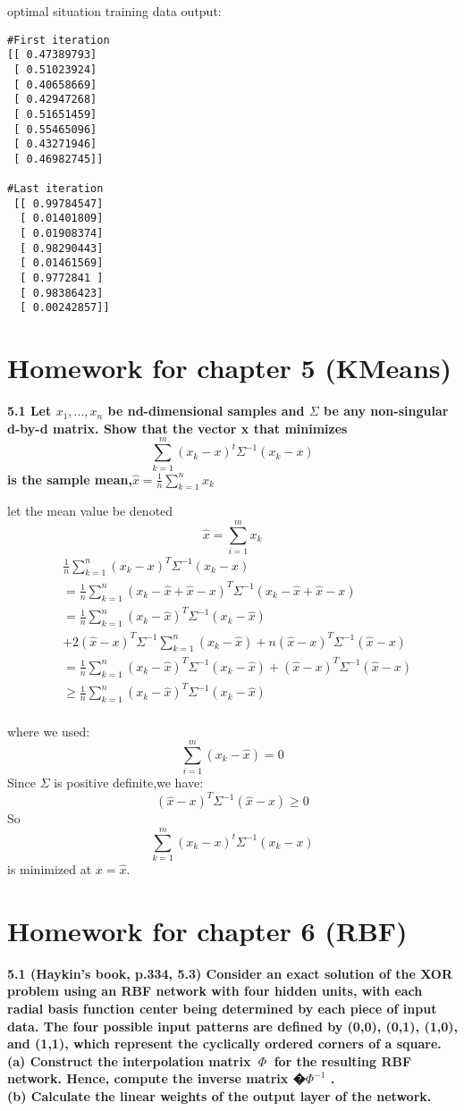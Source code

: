 \noindent optimal situation training data output:
\begin{lstlisting}
#First iteration
[[ 0.47389793]
 [ 0.51023924]
 [ 0.40658669]
 [ 0.42947268]
 [ 0.51651459]
 [ 0.55465096]
 [ 0.43271946]
 [ 0.46982745]]

#Last iteration
 [[ 0.99784547]
  [ 0.01401809]
  [ 0.01908374]
  [ 0.98290443]
  [ 0.01461569]
  [ 0.9772841 ]
  [ 0.98386423]
  [ 0.00242857]]
\end{lstlisting}






\newpage
\section{Homework for chapter 5 (KMeans)}
\noindent \textbf{5.1 Let $x_1,...,x_n$ be nd-dimensional samples and $\Sigma$ be any non-singular d-by-d matrix. Show that the vector x that minimizes
$$\sum_{k=1}^{m}(x_k-x)^t\Sigma^{-1}(x_k-x)$$
is  the sample mean,$\hat{x} = \frac{1}{n}\sum_{k=1}^{n}x_k$}

let the mean value be denoted$$\hat{x}=\sum_{i=1}^{m}x_k$$
\begin{align}
&\frac{1}{n}\sum_{k=1}^{n}(x_k-x)^T\Sigma^{-1}(x_k-x)\nonumber\\
&=\frac{1}{n}\sum_{k=1}^{n}(x_k-\hat{x}+\hat{x}-x)^T\Sigma^{-1}(x_k-\hat{x}+\hat{x}-x)\nonumber\\
&=\frac{1}{n}\sum_{k=1}^{n}(x_k-\hat{x})^T\Sigma^{-1}(x_k-\hat{x})\nonumber\\
&+2(\hat{x}-x)^T\Sigma^{-1}\sum_{k=1}^{n}(x_k-\hat{x})+n(\hat{x}-x)^T\Sigma^{-1}(\hat{x}-x)\nonumber\\
&=\frac{1}{n}\sum_{k=1}^{n}(x_k-\hat{x})^T\Sigma^{-1}(x_k-\hat{x})+(\hat{x}-x)^T\Sigma^{-1}(\hat{x}-x)\nonumber\\
&\geq \frac{1}{n}\sum_{k=1}^{n}(x_k-\hat{x})^T\Sigma^{-1}(x_k-\hat{x})\nonumber
\end{align}\\
where we used:
$$\sum_{i=1}^{m}(x_k-\hat{x})=0$$
Since $\Sigma$ is positive definite,we have:
$$(\hat{x}-x)^T\Sigma^{-1}(\hat{x}-x)\geq 0$$
So  $$\sum_{k=1}^{m}(x_k-x)^t\Sigma^{-1}(x_k-x)$$ is minimized at $x=\hat{x}$.


\newpage
\section{Homework for chapter 6 (RBF)}
\noindent \textbf{5.1 (Haykin’s book, p.334, 5.3) Consider an exact solution of the XOR problem using an RBF
network with four hidden units, with each radial basis function center being determined by each
piece of input data. The four possible input patterns are defined by (0,0), (0,1), (1,0), and (1,1),
which represent the cyclically ordered corners of a square.\\
(a) Construct the interpolation matrix $~\Phi~$ for the resulting RBF network. Hence, compute the
inverse matrix �$\Phi^{-1}$ .\\
(b) Calculate the linear weights of the output layer of the network.}


